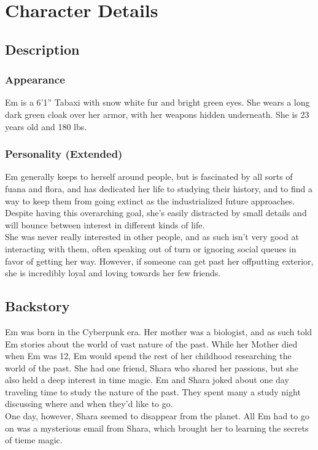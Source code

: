 \documentclass[a4paper,openany,twocolumn]{book}
\begin{document}
\onecolumn






\restoregeometry
\twocolumn

\chapter*{Character Details}

\section*{Description}
\subsection*{Appearance}
Em is a 6'1'' Tabaxi with snow white fur and bright green eyes. She wears
a long dark green cloak over her armor, with her weapons hidden underneath. She
is 23 years old and 180 lbs.
\subsection*{Personality (Extended)}
Em generally keeps to herself around people, but is fascinated by all sorts of
fuana and flora, and has dedicated her life to studying their history, and to
find a way to keep them from going extinct as the industrialized future
approaches. Despite having this overarching goal, she's easily distracted by
small details and will bounce between interest in different kinds of life. \\
She was never really interested in other people, and as such isn't very good at
interacting with them, often speaking out of turn or ignoring social queues in
favor of getting her way. However, if someone can get past her offputting
exterior, she is incredibly loyal and loving towards her few friends.
\section*{Backstory}
Em was born in the Cyberpunk era. Her mother was a biologist, and as such told
Em stories about the world of vast nature of the past. While her Mother died
when Em was 12, Em would spend the rest of her childhood researching the world
of the past. She had one friend, Shara who shared her passions, but she also
held a deep interest in time magic. Em and Shara joked about one day traveling
time to study the nature of the past. They spent many a study night discussing
where and when they'd like to go. \\ One day, however, Shara seemed to disappear
from the planet. All Em had to go on was a mysterious email from Shara, which
brought her to learning the secrets of tieme magic.
\end{document}
